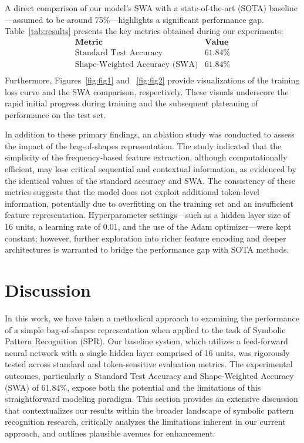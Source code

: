 \documentclass{article}
\begin{document}
A direct comparison of our model's SWA with a state-of-the-art (SOTA) baseline—assumed to be around 75\%—highlights a significant performance gap. Table~\ref{tab:results} presents the key metrics obtained during our experiments:
\[
\begin{array}{l|c}
\textbf{Metric} & \textbf{Value} \\
\hline
\text{Standard Test Accuracy} & 61.84\% \\
\text{Shape-Weighted Accuracy (SWA)} & 61.84\% \\
\end{array}
\]
Furthermore, Figures~\ref{fig:fig1} and ~\ref{fig:fig2} provide visualizations of the training loss curve and the SWA comparison, respectively. These visuals underscore the rapid initial progress during training and the subsequent plateauing of performance on the test set.

In addition to these primary findings, an ablation study was conducted to assess the impact of the bag-of-shapes representation. The study indicated that the simplicity of the frequency-based feature extraction, although computationally efficient, may lose critical sequential and contextual information, as evidenced by the identical values of the standard accuracy and SWA. The consistency of these metrics suggests that the model does not exploit additional token-level information, potentially due to overfitting on the training set and an insufficient feature representation. Hyperparameter settings—such as a hidden layer size of 16 units, a learning rate of 0.01, and the use of the Adam optimizer—were kept constant; however, further exploration into richer feature encoding and deeper architectures is warranted to bridge the performance gap with SOTA methods.

\section{Discussion}
In this work, we have taken a methodical approach to examining the performance of a simple bag-of-shapes representation when applied to the task of Symbolic Pattern Recognition (SPR). Our baseline system, which utilizes a feed-forward neural network with a single hidden layer comprised of 16 units, was rigorously tested across standard and token-sensitive evaluation metrics. The experimental outcomes, particularly a Standard Test Accuracy and Shape-Weighted Accuracy (SWA) of 61.84\%, expose both the potential and the limitations of this straightforward modeling paradigm. This section provides an extensive discussion that contextualizes our results within the broader landscape of symbolic pattern recognition research, critically analyzes the limitations inherent in our current approach, and outlines plausible avenues for enhancement.
\end{document}
